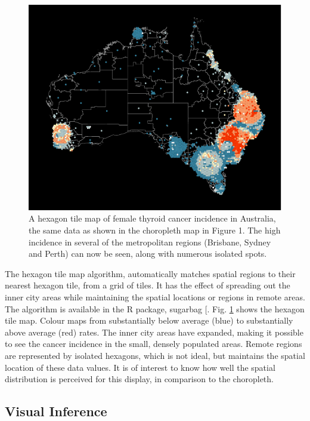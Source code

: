 \documentclass[
]{article}
\begin{document}
\begin{figure}

{\centering \includegraphics[width=1\linewidth,height=0.3\textheight]{paper_files/figure-latex/thyroid-hex-1} 

}

\caption{A hexagon tile map of female thyroid cancer incidence in Australia, the same data as shown in the choropleth map in Figure 1. The high incidence in several of the metropolitan regions (Brisbane, Sydney and Perth) can now be seen, along with numerous isolated spots.}\label{fig:thyroid-hex}
\end{figure}

The hexagon tile map algorithm, automatically matches spatial regions to
their nearest hexagon tile, from a grid of tiles. It has the effect of
spreading out the inner city areas while maintaining the spatial
locations or regions in remote areas. The algorithm is available in the
R package, sugarbag {[}\citeproc{ref-sugarbag}{1}{]}. Fig.
\ref{fig:thyroid-hex} shows the hexagon tile map. Colour maps from
substantially below average (blue) to substantially above average (red)
rates. The inner city areas have expanded, making it possible to see the
cancer incidence in the small, densely populated areas. Remote regions
are represented by isolated hexagons, which is not ideal, but maintains
the spatial location of these data values. It is of interest to know how
well the spatial distribution is perceived for this display, in
comparison to the choropleth.

\subsection{Visual Inference}\label{visual-inference}
\end{document}
